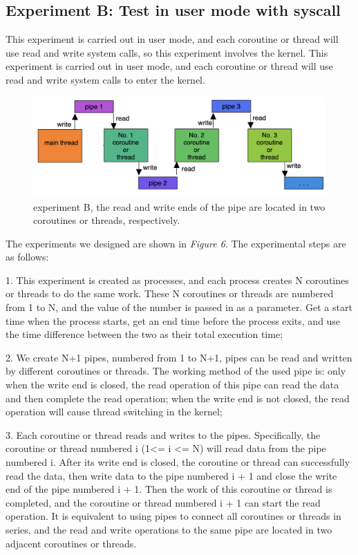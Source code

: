 \documentclass[10pt]{article}
\begin{document}
\subsection{Experiment B: Test in user mode with syscall}

This experiment is carried out in user mode, and each coroutine or thread will use read and write system calls, so this experiment involves the kernel. This experiment is carried out in user mode, and each coroutine or thread will use read and write system calls to enter the kernel. 

\begin{figure}[ht]
\begin{center}
\centerline{\includegraphics[width=\columnwidth]{test2.png}}
\caption{experiment B, the read and write ends of the pipe are located in two coroutines or threads, respectively.}
\label{test2}
\end{center}
\end{figure}

The experiments we designed are shown in \textit{Figure 6}. The experimental steps are as follows:

1. This experiment is created as processes, and each process creates N coroutines or threads to do the same work. These N coroutines or threads are numbered from 1 to N, and the value of the number is passed in as a parameter. Get a start time when the process starts, get an end time before the process exits, and use the time difference between the two as their total execution time;

2. We create N+1 pipes, numbered from 1 to N+1, pipes can be read and written by different coroutines or threads. The working method of the used pipe is: only when the write end is closed, the read operation of this pipe can read the data and then complete the read operation; when the write end is not closed, the read operation will cause thread switching in the kernel;

3. Each coroutine or thread reads and writes to the pipes. Specifically, the coroutine or thread numbered i (1<= i <= N) will read data from the pipe numbered i. After its write end is closed, the coroutine or thread can successfully read the data, then write data to the pipe numbered i + 1 and close the write end of the pipe numbered i + 1. Then the work of this coroutine or thread is completed, and the coroutine or thread numbered i + 1 can start the read operation. It is equivalent to using pipes to connect all coroutines or threads in series, and the read and write operations to the same pipe are located in two adjacent coroutines or threads.
\end{document}
